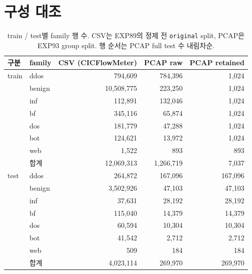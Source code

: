 \section{구성 대조}
\begin{table}[H]
\centering\small
\caption{train / test별 family 행 수. CSV는 EXP89의 정제 전 \texttt{original} split, PCAP은 EXP93 group split. 행 순서는 PCAP full test 수 내림차순.}
\begin{tabular}{llrrr}
\toprule
구분 & family & CSV (CICFlowMeter) & PCAP raw & PCAP retained\\\midrule
train & ddos   & 794,609 & 784,396 & 1,024\\
      & benign & 10,508,775 & 223,250 & 1,024\\
      & inf    & 112,891 & 132,046 & 1,024\\
      & bf     & 345,116 & 65,874 & 1,024\\
      & dos    & 181,779 & 47,288 & 1,024\\
      & bot    & 124,621 & 13,972 & 1,024\\
      & web    & 1,522 & 893 & 893\\
      & 합계   & 12,069,313 & 1,266,719 & 7,037\\\midrule
test  & ddos   & 264,872 & 167,096 & 167,096\\
      & benign & 3,502,926 & 47,103 & 47,103\\
      & inf    & 37,631 & 28,192 & 28,192\\
      & bf     & 115,040 & 14,379 & 14,379\\
      & dos    & 60,594 & 10,304 & 10,304\\
      & bot    & 41,542 & 2,712 & 2,712\\
      & web    & 509 & 184 & 184\\
      & 합계   & 4,023,114 & 269,970 & 269,970\\
\bottomrule
\end{tabular}
\end{table}

